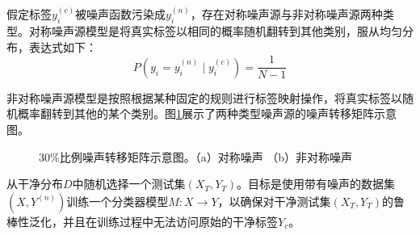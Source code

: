假定标签$y_i^{(c)}$被噪声函数污染成$y_i^{(n)}$，存在对称噪声源与非对称噪声源两种类型。对称噪声源模型是将真实标签以相同的概率随机翻转到其他类别，服从均匀分布，表达式如下：
\begin{equation}
  P(y_i=y_i^{(n)} \mid y_i^{(c)})=\frac{1}{N-1}
\end{equation}

非对称噪声源模型是按照根据某种固定的规则进行标签映射操作，将真实标签以随机概率翻转到其他的某个类别。图\ref{fig:noisy_type}展示了两种类型噪声源的噪声转移矩阵示意图。
\begin{figure}[ht!]
  \caption{30\%比例噪声转移矩阵示意图。（a）对称噪声 （b）非对称噪声}
  \label{fig:noisy_type}
\end{figure}

从干净分布$D$中随机选择一个测试集$(X_T, Y_T)$。目标是使用带有噪声的数据集$(X, Y^{(n)})$训练一个分类器模型$M:X \rightarrow Y$，以确保对干净测试集$(X_T, Y_T)$的鲁棒性泛化，并且在训练过程中无法访问原始的干净标签$Y_c$。


